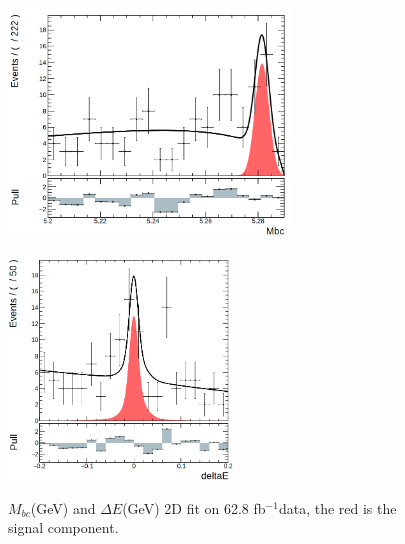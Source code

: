 \begin{figure}[htbp]
	\begin{minipage}[b]{0.5\linewidth}
		\centering 
		\includegraphics[height=6cm]{figures/mbc_data_new}
		\label{}
	\end{minipage}
	\begin{minipage}[b]{0.5\linewidth}
		\centering 
		\includegraphics[height=6cm]{figures/dE_data_new}
		\label{}
	\end{minipage}
\caption{$M_{bc}$(GeV) and $\Delta E$(GeV) 2D fit on 62.8 fb$^{-1}$data, the red is the signal component.}
\label{fig:2Ddata}
\end{figure}

